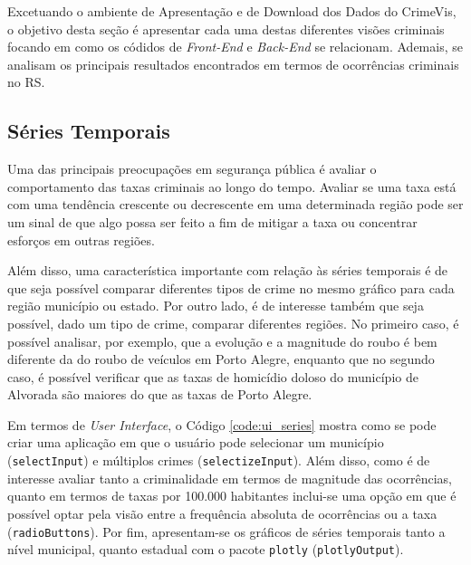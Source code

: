 \documentclass[12pt,openright,oneside,a4paper,english,french,spanish]{abntex2}
\numberwithin{table}{section} %
\numberwithin{figure}{section} %
\begin{document}
Excetuando o ambiente de Apresentação e de Download dos Dados do CrimeVis, o objetivo desta seção é apresentar cada uma destas diferentes visões criminais focando em como os códidos de \textit{Front-End} e \textit{Back-End} se relacionam. Ademais, se analisam os principais resultados encontrados em termos de ocorrências criminais no RS.

\subsection{Séries Temporais\label{sec:series_temporais}}

Uma das principais preocupações em segurança pública é avaliar o comportamento das taxas criminais ao longo do tempo. Avaliar se uma taxa está com uma tendência crescente ou decrescente em uma determinada região pode ser um sinal de que algo possa ser feito a fim de mitigar a taxa ou concentrar esforços em outras regiões.

Além disso, uma característica importante com relação às séries temporais é de que seja possível comparar diferentes tipos de crime no mesmo gráfico para cada região município ou estado. Por outro lado, é de interesse também que seja possível, dado um tipo de crime, comparar diferentes regiões. No primeiro caso, é possível analisar, por exemplo, que a evolução e a magnitude do roubo é bem diferente da do roubo de veículos em Porto Alegre, enquanto que no segundo caso, é possível verificar que as taxas de homicídio doloso do município de Alvorada são maiores do que as taxas de Porto Alegre.

Em termos de \textit{User Interface}, o Código \ref{code:ui_series} mostra como se pode criar uma aplicação em que o usuário pode selecionar um município (\texttt{selectInput}) e múltiplos crimes (\texttt{selectizeInput}). Além disso, como é de interesse avaliar tanto a criminalidade em termos de magnitude das ocorrências, quanto em termos de taxas por 100.000 habitantes inclui-se uma opção em que é possível optar pela visão entre a frequência absoluta de ocorrências ou a taxa (\texttt{radioButtons}). Por fim, apresentam-se os gráficos de séries temporais tanto a nível municipal, quanto estadual com o pacote \texttt{plotly} (\texttt{plotlyOutput}).
\end{document}
